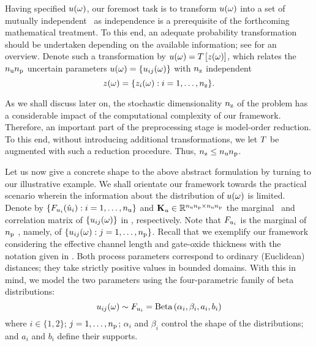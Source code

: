 Having specified $u(\omega)$, our foremost task is to transform $u(\omega)$ into a set of mutually independent \rvs\ as independence is a prerequisite of the forthcoming mathematical treatment.
To this end, an adequate probability transformation should be undertaken depending on the available information; see \cite{eldred2008} for an overview.
Denote such a transformation by $\u(\o) = \oTransform{\z(\o)}$, which relates the ${n_\text{u}} {n_\text{p}}$ uncertain parameters $u(\omega) = \{ u_{ij}(\omega) \}$ with ${n_\text{z}}$ independent \rvs
\begin{equation} \elab{independent-random-variables}
  \z(\o) = \{ \z_i(\o): i = 1, \dots, \nvars \}.
\end{equation}

As we shall discuss later on, the stochastic dimensionality ${n_\text{z}}$ of the problem has a considerable impact of the computational complexity of our framework.
Therefore, an important part of the preprocessing stage is model-order reduction.
To this end, without introducing additional transformations, we let $\oTransform$ be augmented with such a reduction procedure.
Thus, ${n_\text{z}} \leq {n_\text{u}} {n_\text{p}}$.

Let us now give a concrete shape to the above abstract formulation by turning to our illustrative example.
We shall orientate our framework towards the practical scenario wherein the information about the distribution of $u(\omega)$ is limited.
Denote by $\{ F_{u_i}(\hat{u}_i): i = 1, \dots, {n_\text{u}} \}$ and $\mathbf{K}_u \in \mathbb{R}^{{n_\text{u}} {n_\text{p}} \times {n_\text{u}} {n_\text{p}}}$ the marginal \cdfs\ and correlation matrix of $\{ u_{ij}(\omega) \}$ in , respectively.
Note that $F_{u_i}$ is the marginal of ${n_\text{p}}$ \rvs, namely, of $\{ u_{ij}(\omega): j = 1, \dots, {n_\text{p}} \}$.
Recall that we exemplify our framework considering the effective channel length and gate-oxide thickness with the notation given in .
Both process parameters correspond to ordinary (Euclidean) distances; they take strictly positive values in bounded domains.
With this in mind, we model the two parameters using the four-parametric family of beta distributions:
\begin{equation*}
  u_{ij}(\omega) \sim F_{u_i} = \text{Beta}\left( \alpha_i, \beta_i, a_i, b_i \right)
\end{equation*}
where $i \in \{ 1, 2 \}$; $j = 1, \dots, {n_\text{p}}$; $\alpha_i$ and $\beta_i$ control the shape of the distributions; and $a_i$ and $b_i$ define their supports.

